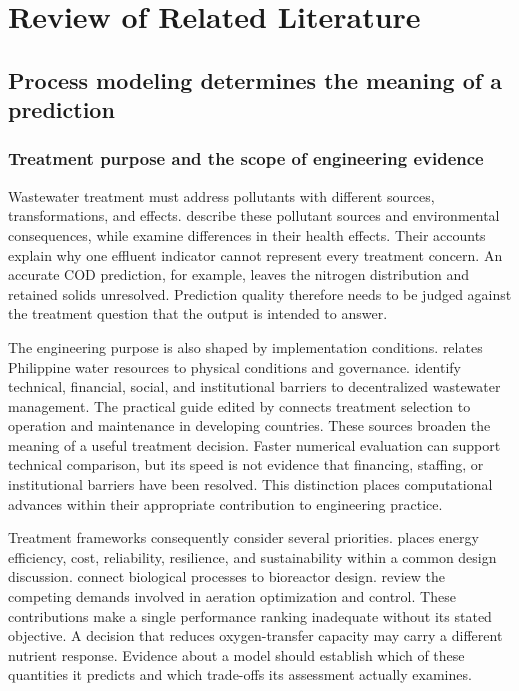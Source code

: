 \chapter{Review of Related Literature}
\label{ch:literature}

\section{Process modeling determines the meaning of a prediction}

\subsection{Treatment purpose and the scope of engineering evidence}

Wastewater treatment must address pollutants with different sources, transformations, and effects. \citet{Madhav2019} describe these pollutant sources and environmental consequences, while \citet{Lin2022} examine differences in their health effects. Their accounts explain why one effluent indicator cannot represent every treatment concern. An accurate COD prediction, for example, leaves the nitrogen distribution and retained solids unresolved. Prediction quality therefore needs to be judged against the treatment question that the output is intended to answer.

The engineering purpose is also shaped by implementation conditions. \citet{Tabios2020} relates Philippine water resources to physical conditions and governance. \citet{DamalerioBarriers2022} identify technical, financial, social, and institutional barriers to decentralized wastewater management. The practical guide edited by \citet{Ulrich2009} connects treatment selection to operation and maintenance in developing countries. These sources broaden the meaning of a useful treatment decision. Faster numerical evaluation can support technical comparison, but its speed is not evidence that financing, staffing, or institutional barriers have been resolved. This distinction places computational advances within their appropriate contribution to engineering practice.

Treatment frameworks consequently consider several priorities. \citet{Jafarinejad2020} places energy efficiency, cost, reliability, resilience, and sustainability within a common design discussion. \citet{Narayanan2019} connect biological processes to bioreactor design. \citet{Gu2023} review the competing demands involved in aeration optimization and control. These contributions make a single performance ranking inadequate without its stated objective. A decision that reduces oxygen-transfer capacity may carry a different nutrient response. Evidence about a model should establish which of these quantities it predicts and which trade-offs its assessment actually examines.

